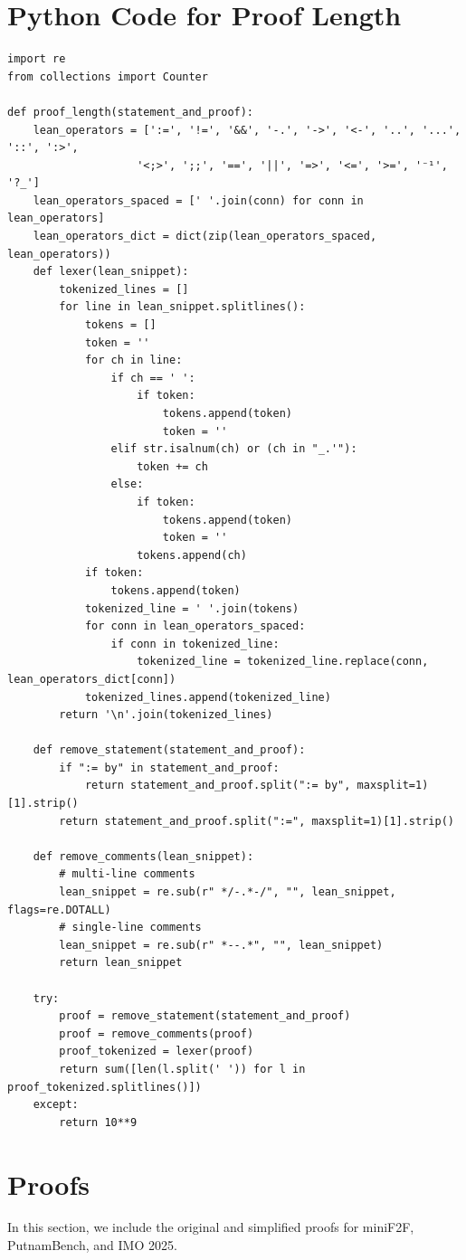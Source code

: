 \section{Python Code for Proof Length}
\begin{lstlisting}[breaklines=true, style=mystyle, language=lean]
import re
from collections import Counter

def proof_length(statement_and_proof):
    lean_operators = [':=', '!=', '&&', '-.', '->', '<-', '..', '...', '::', ':>',
                    '<;>', ';;', '==', '||', '=>', '<=', '>=', '⁻¹', '?_']
    lean_operators_spaced = [' '.join(conn) for conn in lean_operators]
    lean_operators_dict = dict(zip(lean_operators_spaced, lean_operators))
    def lexer(lean_snippet):
        tokenized_lines = []
        for line in lean_snippet.splitlines():
            tokens = []
            token = ''
            for ch in line:
                if ch == ' ':
                    if token:
                        tokens.append(token)
                        token = ''
                elif str.isalnum(ch) or (ch in "_.'"):
                    token += ch
                else:
                    if token:
                        tokens.append(token)
                        token = ''
                    tokens.append(ch)
            if token:
                tokens.append(token)
            tokenized_line = ' '.join(tokens)
            for conn in lean_operators_spaced:
                if conn in tokenized_line:
                    tokenized_line = tokenized_line.replace(conn, lean_operators_dict[conn])
            tokenized_lines.append(tokenized_line)
        return '\n'.join(tokenized_lines)

    def remove_statement(statement_and_proof):
        if ":= by" in statement_and_proof:
            return statement_and_proof.split(":= by", maxsplit=1)[1].strip()
        return statement_and_proof.split(":=", maxsplit=1)[1].strip()

    def remove_comments(lean_snippet):
        # multi-line comments
        lean_snippet = re.sub(r" */-.*-/", "", lean_snippet, flags=re.DOTALL)
        # single-line comments
        lean_snippet = re.sub(r" *--.*", "", lean_snippet)
        return lean_snippet

    try:
        proof = remove_statement(statement_and_proof)
        proof = remove_comments(proof)
        proof_tokenized = lexer(proof)
        return sum([len(l.split(' ')) for l in proof_tokenized.splitlines()])
    except:
        return 10**9
\end{lstlisting}

\newpage
\section{Proofs}
In this section, we include the original and simplified proofs for miniF2F, PutnamBench, and IMO 2025.